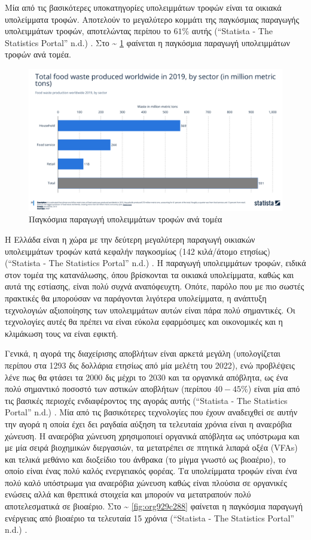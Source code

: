 \documentclass[11pt]{article}
\begin{document}
Μία από τις βασικότερες υποκατηγορίες υπολειμμάτων τροφών είναι τα οικιακά υπολείμματα τροφών. Αποτελούν το μεγαλύτερο κομμάτι της παγκόσμιας παραγωγής υπολειμμάτων τροφών, αποτελώντας περίπου το \(61 \%\) αυτής (“Statista - The Statistics Portal” n.d.) . Στο \figurename\textasciitilde{} \ref{fig:orge19f8e8} φαίνεται η παγκόσμια παραγωγή υπολειμμάτων τροφών ανά τομέα.
\begin{figure}[htbp]
\centering
\includegraphics[width=.9\linewidth]{../plots/statistics/statistic_food_waste_by_sector_2019.png}
\caption{\label{fig:orge19f8e8}Παγκόσμια παραγωγή υπολειμμάτων τροφών ανά τομέα}
\end{figure}

Η Ελλάδα είναι η χώρα με την δεύτερη μεγαλύτερη παραγωγή οικιακών υπολειμμάτων τροφών κατά κεφαλήν παγκοσμίως (142 κιλά/άτομο ετησίως) (“Statista - The Statistics Portal” n.d.) . Η παραγωγή υπολειμμάτων τροφών, ειδικά στον τομέα της κατανάλωσης, όπου βρίσκονται τα οικιακά υπολείμματα, καθώς και αυτά της εστίασης, είναι πολύ συχνά αναπόφευχτη. Οπότε, παρόλο που με πιο σωστές πρακτικές θα μπορούσαν να παράγονται λιγότερα υπολείμματα, η ανάπτυξη τεχνολογιών αξιοποίησης των υπολειμμάτων αυτών είναι πάρα πολύ σημαντικές. Οι τεχνολογίες αυτές θα πρέπει να είναι εύκολα εφαρμόσιμες και οικονομικές και η κλιμάκωση τους να είναι εφικτή.

Γενικά, η αγορά της διαχείρισης αποβλήτων είναι αρκετά μεγάλη (υπολογίζεται περίπου στα 1293 δις δολλάρια ετησίως από μία μελέτη του 2022), ενώ προβλέψεις λένε πως θα φτάσει τα 2000 δις μέχρι το 2030 και τα οργανικά απόβλητα, ως ένα πολύ σημαντικό ποσοστό των αστικών αποβλήτων (περίπου \(40-45 \%\)) είναι μία από τις βασικές περιοχές ενδιαφέροντος της αγοράς αυτής (“Statista - The Statistics Portal” n.d.) . Μία από τις βασικότερες τεχνολογίες που έχουν αναδειχθεί σε αυτήν την αγορά η οποία έχει δει ραγδαία αύξηση τα τελευταία χρόνια είναι η αναερόβια χώνευση. Η αναερόβια χώνευση χρησιμοποιεί οργανικά απόβλητα ως υπόστρωμα και με μία σειρά βιοχημικών διεργασιών, τα μετατρέπει σε πτητικά λιπαρά οξέα (VFAs) και τελικά μεθάνιο και διοξείδιο του άνθρακα (το μίγμα γνωστό ως βιοαέριο), το οποίο είναι ένας πολύ καλός ενεργειακός φορέας. Τα υπολείμματα τροφών είναι ένα πολύ καλό υπόστρωμα για αναερόβια χώνευση καθώς είναι πλούσια σε οργανικές ενώσεις αλλά και θρεπτικά στοιχεία και μπορούν να μετατραπούν πολύ αποτελεσματικά σε βιοαέριο. Στο \figurename\textasciitilde{} \ref{fig:org929c288} φαίνεται η παγκόσμια παραγωγή ενέργειας από βιοαέριο τα τελευταία 15 χρόνια (“Statista - The Statistics Portal” n.d.) .
\end{document}
